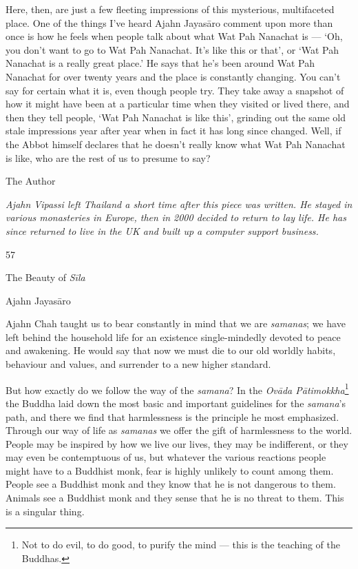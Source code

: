 Here, then, are just a few fleeting impressions of this mysterious,
multifaceted place. One of the things I've heard Ajahn Jayasāro comment
upon more than once is how he feels when people talk about what Wat Pah
Nanachat is --- `Oh, you don't want to go to Wat Pah Nanachat. It's like
this or that', or `Wat Pah Nanachat is a really great place.' He says
that he's been around Wat Pah Nanachat for over twenty years and the
place is constantly changing. You can't say for certain what it is, even
though people try. They take away a snapshot of how it might have been
at a particular time when they visited or lived there, and then they
tell people, `Wat Pah Nanachat is like this', grinding out the same old
stale impressions year after year when in fact it has long since
changed. Well, if the Abbot himself declares that he doesn't really know
what Wat Pah Nanachat is like, who are the rest of us to presume to say?

The Author

\emph{Ajahn Vipassi left Thailand a short time after this piece was
written. He stayed in various monasteries in Europe, then in 2000
decided to return to lay life. He has since returned to live in the UK
and built up a computer support business.}



57

The Beauty of \emph{Sīla}

Ajahn Jayasāro

Ajahn Chah taught us to bear constantly in mind that we are
\emph{samanas}; we have left behind the household life for an existence
single-mindedly devoted to peace and awakening. He would say that now we
must die to our old worldly habits, behaviour and values, and surrender
to a new higher standard.

But how exactly do we follow the way of the \emph{samana}? In the
\emph{Ovāda Pātimokkha}\footnote{Not to do evil, to do good, to purify
  the mind --- this is the teaching of the Buddhas.} the Buddha laid
down the most basic and important guidelines for the \emph{samana}'s
path, and there we find that harmlessness is the principle he most
emphasized. Through our way of life as \emph{samanas} we offer the gift
of harmlessness to the world. People may be inspired by how we live our
lives, they may be indifferent, or they may even be contemptuous of us,
but whatever the various reactions people might have to a Buddhist monk,
fear is highly unlikely to count among them. People see a Buddhist monk
and they know that he is not dangerous to them. Animals see a Buddhist
monk and they sense that he is no threat to them. This is a singular
thing.

